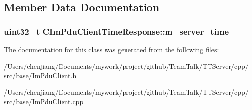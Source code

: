\subsection{Member Data Documentation}
\hypertarget{class_c_im_pdu_client_time_response_a40aa936a8e0706f31f9c297a9f1e2751}{}
\subsubsection[{m\+\_\+server\+\_\+time}]{\setlength{\rightskip}{0pt plus 5cm}uint32\+\_\+t C\+Im\+Pdu\+Client\+Time\+Response\+::m\+\_\+server\+\_\+time\hspace{0.3cm}{\ttfamily [private]}}\label{class_c_im_pdu_client_time_response_a40aa936a8e0706f31f9c297a9f1e2751}


The documentation for this class was generated from the following files\+:\begin{DoxyCompactItemize}
\item 
/\+Users/chenjiang/\+Documents/mywork/project/github/\+Team\+Talk/\+T\+T\+Server/cpp/src/base/\hyperlink{_im_pdu_client_8h}{Im\+Pdu\+Client.\+h}\item 
/\+Users/chenjiang/\+Documents/mywork/project/github/\+Team\+Talk/\+T\+T\+Server/cpp/src/base/\hyperlink{_im_pdu_client_8cpp}{Im\+Pdu\+Client.\+cpp}\end{DoxyCompactItemize}
